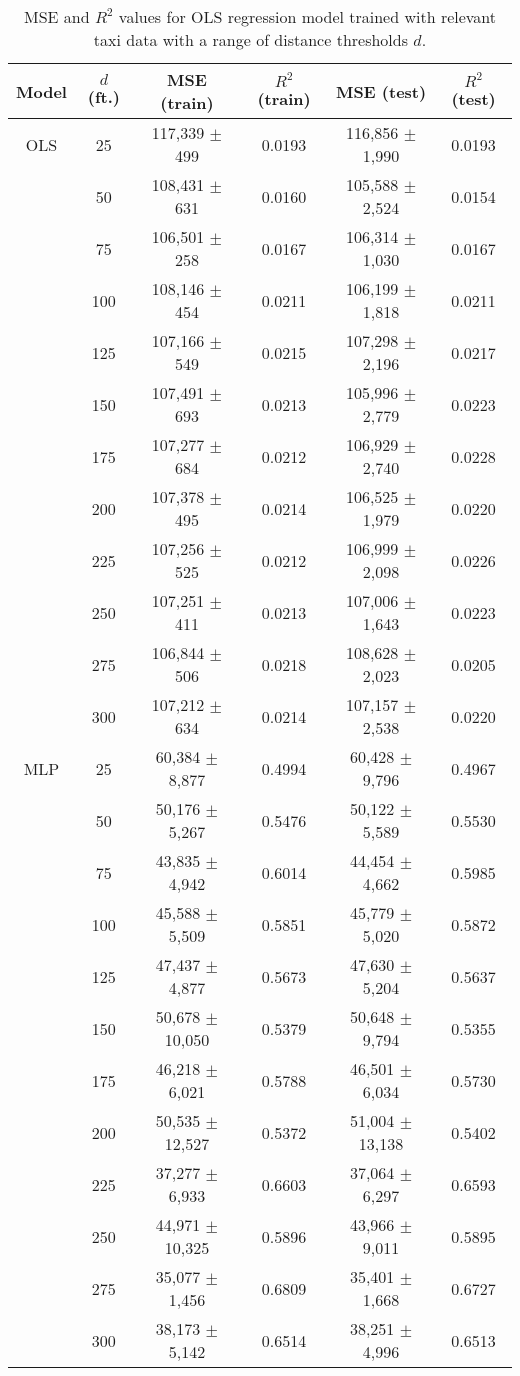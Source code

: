 \documentclass[useAMS, usenatbib]{biom}
\begin{document}
\begin{table}
\caption{MSE and $R^2$ values for OLS regression model trained with relevant taxi data with a range of distance thresholds $d$.}
\label{t:taxi_performance}
\begin{center}
\resizebox{\columnwidth}{!}
{
 \begin{tabular}{||c|c|c|c|c|c||}
 \hline
 Model & $d$ (ft.) & MSE (train) & $R^2$ (train) & MSE (test) & $R^2$ (test) \\
 \hline
 OLS & 25 & 117,339 $\pm$ 499 & 0.0193 & 116,856 $\pm$ 1,990 & 0.0193 \\
 & 50 & 108,431 $\pm$ 631 & 0.0160 & 105,588 $\pm$ 2,524 & 0.0154 \\
 & 75 & 106,501 $\pm$ 258 & 0.0167 & 106,314 $\pm$ 1,030 & 0.0167 \\
 & 100 & 108,146 $\pm$ 454 & 0.0211 & 106,199 $\pm$ 1,818 & 0.0211 \\
 & 125 & 107,166 $\pm$ 549 & 0.0215 & 107,298 $\pm$ 2,196 & 0.0217 \\
 & 150 & 107,491 $\pm$ 693 & 0.0213 & 105,996 $\pm$ 2,779 & 0.0223 \\
 & 175 & 107,277 $\pm$ 684 & 0.0212 & 106,929 $\pm$ 2,740 & 0.0228 \\
 & 200 & 107,378 $\pm$ 495 & 0.0214 & 106,525 $\pm$ 1,979 & 0.0220 \\
 & 225 & 107,256 $\pm$ 525 & 0.0212 & 106,999 $\pm$ 2,098 & 0.0226 \\
 & 250 & 107,251 $\pm$ 411 & 0.0213 & 107,006 $\pm$ 1,643 & 0.0223 \\
 & 275 & 106,844 $\pm$ 506 & 0.0218 & 108,628 $\pm$ 2,023 & 0.0205 \\
 & 300 & 107,212 $\pm$ 634 & 0.0214 & 107,157 $\pm$ 2,538 & 0.0220 \\
 \hline
 MLP & 25 & 60,384 $\pm$ 8,877 & 0.4994 & 60,428 $\pm$ 9,796 & 0.4967 \\
 & 50 & 50,176 $\pm$ 5,267 & 0.5476 & 50,122 $\pm$ 5,589 & 0.5530 \\
 & 75 & 43,835 $\pm$ 4,942 & 0.6014 & 44,454 $\pm$ 4,662 & 0.5985 \\
 & 100 & 45,588 $\pm$ 5,509 & 0.5851 & 45,779 $\pm$ 5,020 & 0.5872 \\
 & 125 & 47,437 $\pm$ 4,877 & 0.5673 & 47,630 $\pm$ 5,204 & 0.5637 \\
 & 150 & 50,678 $\pm$ 10,050 & 0.5379 & 50,648 $\pm$ 9,794 & 0.5355 \\
 & 175 & 46,218 $\pm$ 6,021 & 0.5788 & 46,501 $\pm$ 6,034 & 0.5730 \\
 & 200 & 50,535 $\pm$ 12,527 & 0.5372 & 51,004 $\pm$ 13,138 & 0.5402 \\
 & 225 & 37,277 $\pm$ 6,933 & 0.6603 & 37,064 $\pm$ 6,297 & 0.6593 \\
 & 250 & 44,971 $\pm$ 10,325 & 0.5896 & 43,966 $\pm$ 9,011 & 0.5895 \\
 & 275 & 35,077 $\pm$ 1,456 & 0.6809 & 35,401 $\pm$ 1,668 & 0.6727 \\
 & 300 & 38,173 $\pm$ 5,142 & 0.6514 & 38,251 $\pm$ 4,996 & 0.6513 \\
 \hline
\end{tabular}
}
\end{center}
\end{table}
\end{document}
